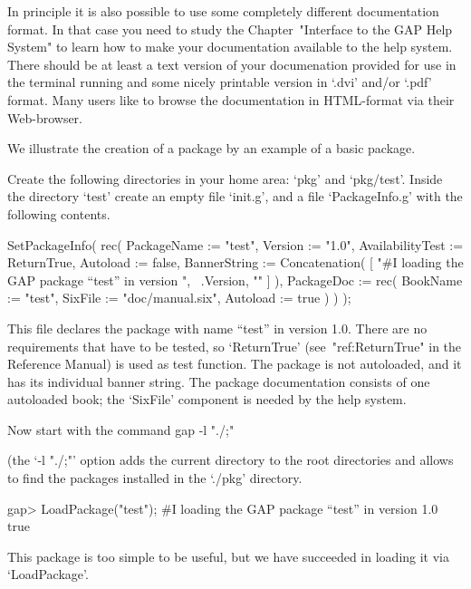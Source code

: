 In  principle it  is also  possible to  use some  completely different
documentation   format.  In   that  case   you  need   to  study   the
Chapter~"Interface to the  GAP Help System" to learn how  to make your
documentation available to the {\GAP}  help system. There should be at
least  a  text  version  of  your documenation  provided  for  use  in
the  terminal running  {\GAP}  and some  nicely  printable version  in
`.dvi'  and/or `.pdf'  format. Many  {\GAP} users  like to  browse the
documentation in HTML-format via their Web-browser.


We illustrate  the creation  of a  {\GAP} package by  an example  of a
basic package. 

Create  the  following  directories  in  your  home  area:  `pkg'  and
`pkg/test'. Inside the directory `test' create an empty file `init.g',
and a file `PackageInfo.g' with the following contents.

\begintt
SetPackageInfo( rec(
  PackageName := "test",
  Version := "1.0",
  AvailabilityTest := ReturnTrue,
  Autoload := false,
  BannerString := Concatenation( [
      "#I  loading the GAP package ``test'' in version ",
      ~.Version, "\n" ] ),
  PackageDoc := rec(
      BookName  := "test",
      SixFile   := "doc/manual.six",
      Autoload  := true ) ) );
\endtt

This file  declares the {\GAP}  package with name ``test''  in version
1.0. There are no requirements that have to be tested, so `ReturnTrue'
(see~"ref:ReturnTrue" in the {\GAP} Reference  Manual) is used as test
function. The  package is  not autoloaded, and  it has  its individual
banner string.  The package  documentation consists of  one autoloaded
book; the `SixFile' component is needed by the {\GAP} help system.


Now start {\GAP} with the command
\begintt
gap -l "./;"
\endtt

(the `-l "./;"'  option adds the current directory to  the {\GAP} root
directories and  allows {\GAP} to  find the packages installed  in the
`./pkg' directory.

\beginexample
gap> LoadPackage("test");
#I  loading the GAP package ``test'' in version 1.0
true
\endexample

This {\GAP} package is too simple  to be useful, but we have succeeded
in loading it via `LoadPackage'.

